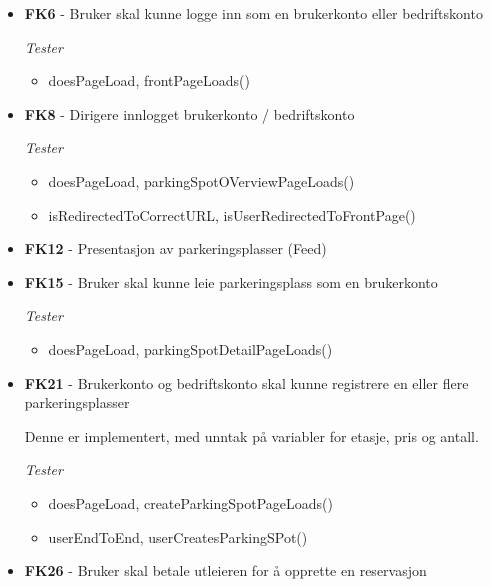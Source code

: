 \documentclass[12pt]{article}
\begin{document}
    \begin{itemize}
        \item \textbf{FK6} - Bruker skal kunne logge inn som en brukerkonto eller bedriftskonto
        
            \textit{Tester}
            \begin{itemize}
                \item doesPageLoad, frontPageLoads()
            \end{itemize}

        \item \textbf{FK8} - Dirigere innlogget brukerkonto / bedriftskonto
        
            \textit{Tester}
            \begin{itemize}
                \item doesPageLoad, parkingSpotOVerviewPageLoads()
                \item isRedirectedToCorrectURL, isUserRedirectedToFrontPage()
            \end{itemize}
        
        \item \textbf{FK12} - Presentasjon av parkeringsplasser (Feed)

        \item \textbf{FK15} - Bruker skal kunne leie parkeringsplass som en brukerkonto 
        
            \textit{Tester}
            \begin{itemize}
                \item doesPageLoad, parkingSpotDetailPageLoads()
            \end{itemize}
        
        \item \textbf{FK21} - Brukerkonto og bedriftskonto skal kunne registrere en eller flere parkeringsplasser
        
        Denne er implementert, med unntak på variabler for etasje, pris og antall.

            \textit{Tester}
            \begin{itemize}
                \item doesPageLoad, createParkingSpotPageLoads()
                \item userEndToEnd, userCreatesParkingSPot()
            \end{itemize}
        
        \item \textbf{FK26} - Bruker skal betale utleieren for å opprette en reservasjon
        

\end{itemize}
\end{document}
